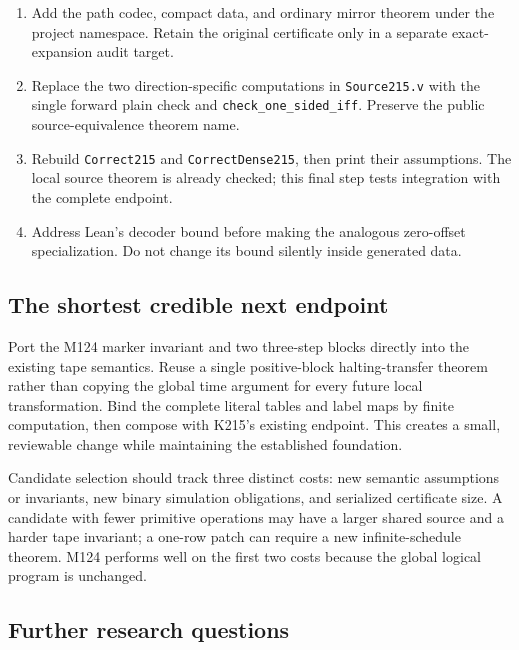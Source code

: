 \documentclass[11pt]{article}
\theoremstyle{remark}\newtheorem{remark}[theorem]{Remark}
\newcommand{\code}[1]{\texttt{\small #1}}
\begin{document}
\begin{enumerate}
\item Add the path codec, compact data, and ordinary mirror theorem under the project namespace. Retain the original certificate only in a separate exact-expansion audit target.
\item Replace the two direction-specific computations in \code{Source215.v} with the single forward plain check and \code{check\_one\_sided\_iff}. Preserve the public source-equivalence theorem name.
\item Rebuild \code{Correct215} and \code{CorrectDense215}, then print their assumptions. The local source theorem is already checked; this final step tests integration with the complete endpoint.
\item Address Lean's decoder bound before making the analogous zero-offset specialization. Do not change its bound silently inside generated data.
\end{enumerate}

\subsection{The shortest credible next endpoint}

Port the M124 marker invariant and two three-step blocks directly into the existing tape semantics. Reuse a single positive-block halting-transfer theorem rather than copying the global time argument for every future local transformation. Bind the complete literal tables and label maps by finite computation, then compose with K215's existing endpoint. This creates a small, reviewable change while maintaining the established foundation.

Candidate selection should track three distinct costs: new semantic assumptions or invariants, new binary simulation obligations, and serialized certificate size. A candidate with fewer primitive operations may have a larger shared source and a harder tape invariant; a one-row patch can require a new infinite-schedule theorem. M124 performs well on the first two costs because the global logical program is unchanged.

\subsection{Further research questions}
\end{document}
